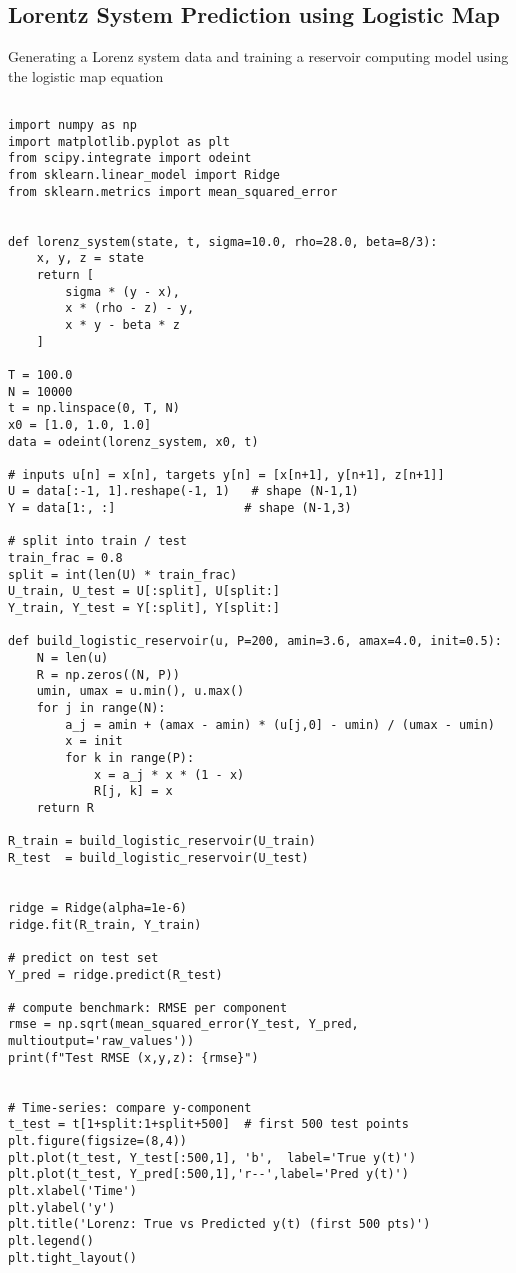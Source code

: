 \subsection*{Lorentz System Prediction using Logistic Map} \label{code_logistic_lorenz}
Generating a Lorenz system data and training a reservoir computing model using the logistic map equation
\begin{verbatim}

import numpy as np
import matplotlib.pyplot as plt
from scipy.integrate import odeint
from sklearn.linear_model import Ridge
from sklearn.metrics import mean_squared_error


def lorenz_system(state, t, sigma=10.0, rho=28.0, beta=8/3):
    x, y, z = state
    return [
        sigma * (y - x),
        x * (rho - z) - y,
        x * y - beta * z
    ]

T = 100.0
N = 10000
t = np.linspace(0, T, N)
x0 = [1.0, 1.0, 1.0]
data = odeint(lorenz_system, x0, t)

# inputs u[n] = x[n], targets y[n] = [x[n+1], y[n+1], z[n+1]]
U = data[:-1, 1].reshape(-1, 1)   # shape (N-1,1)
Y = data[1:, :]                  # shape (N-1,3)

# split into train / test
train_frac = 0.8
split = int(len(U) * train_frac)
U_train, U_test = U[:split], U[split:]
Y_train, Y_test = Y[:split], Y[split:]

def build_logistic_reservoir(u, P=200, amin=3.6, amax=4.0, init=0.5):
    N = len(u)
    R = np.zeros((N, P))
    umin, umax = u.min(), u.max()
    for j in range(N):
        a_j = amin + (amax - amin) * (u[j,0] - umin) / (umax - umin)
        x = init
        for k in range(P):
            x = a_j * x * (1 - x)
            R[j, k] = x
    return R

R_train = build_logistic_reservoir(U_train)
R_test  = build_logistic_reservoir(U_test)


ridge = Ridge(alpha=1e-6)
ridge.fit(R_train, Y_train)

# predict on test set
Y_pred = ridge.predict(R_test)

# compute benchmark: RMSE per component
rmse = np.sqrt(mean_squared_error(Y_test, Y_pred, multioutput='raw_values'))
print(f"Test RMSE (x,y,z): {rmse}")


# Time-series: compare y-component
t_test = t[1+split:1+split+500]  # first 500 test points
plt.figure(figsize=(8,4))
plt.plot(t_test, Y_test[:500,1], 'b',  label='True y(t)')
plt.plot(t_test, Y_pred[:500,1],'r--',label='Pred y(t)')
plt.xlabel('Time')
plt.ylabel('y')
plt.title('Lorenz: True vs Predicted y(t) (first 500 pts)')
plt.legend()
plt.tight_layout()


\end{verbatim}
